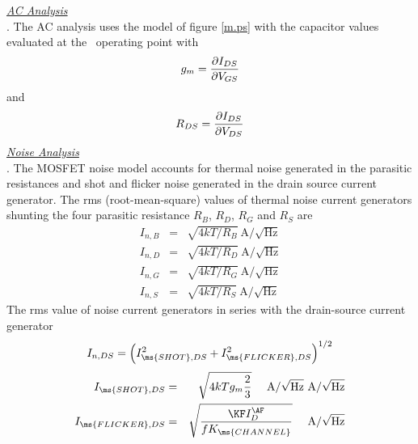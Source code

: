 { }

\noindent\underline{\sl \large AC Analysis}\\[0.1in]
. The AC analysis uses the model of
figure  \ref{m.ps} with the capacitor values evaluated at the \dc\
operating point with
\begin{equation}
g_m = {{\textstyle\partial I_{DS}} \over {\textstyle\partial
V_{GS}}}
\end{equation}
and
\begin{equation}
R_{DS} = {{\textstyle\partial I_{DS}} \over {\textstyle\partial
V_{DS}}}
\end{equation}
\vshift
\noindent\underline{\sl \large Noise Analysis}\\[0.1in]
 . The
MOSFET noise model accounts for thermal noise generated in the
parasitic resistances and shot and flicker noise generated in the
drain source current generator. The rms (root-mean-square) values
of thermal noise current generators shunting the four parasitic
resistance $R_B$, $R_D$, $R_G$ and $R_S$ are
\begin{eqnarray}
I_{n,B} &=& \sqrt{4kT/R_B}~\mbox{A/}\sqrt{\mbox{Hz}}\\
I_{n,D} &=& \sqrt{4kT/R_D}~\mbox{A/}\sqrt{\mbox{Hz}}\\
I_{n,G} &=& \sqrt{4kT/R_G}~\mbox{A/}\sqrt{\mbox{Hz}}\\
I_{n,S} &=& \sqrt{4kT/R_S}~\mbox{A/}\sqrt{\mbox{Hz}}
\end{eqnarray}
The rms value of noise current generators in series with the
drain-source current generator
\begin{equation}
I_{n,DS} = \left( I_{\ms{SHOT},DS}^2 + I_{\ms{FLICKER},DS}^2
\right)^{1/2}
\end{equation}
\begin{eqnarray}
I_{\ms{SHOT},DS} &=& \sqrt{4kTg_m\frac{2}{3}}
~~~~\mbox{A/}\sqrt{\mbox{Hz}}
~\mbox{A/}\sqrt{\mbox{Hz}}\\
I_{\ms{FLICKER},DS} &=& \sqrt{{{\textstyle\KF I_{D}^{\AF}}
                         \over {\textstyle f K_{\ms{CHANNEL}}}}}
~~~~\mbox{A/}\sqrt{\mbox{Hz}}
\end{eqnarray}
